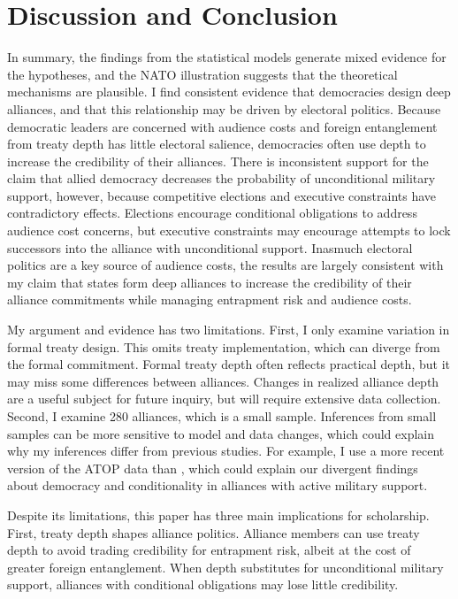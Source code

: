 \documentclass[12pt]{article}
\begin{document}
\section{Discussion and Conclusion} 


In summary, the findings from the statistical models generate mixed evidence for the hypotheses, and the NATO illustration suggests that the theoretical mechanisms are plausible. 
I find consistent evidence that democracies design deep alliances, and that this relationship may be driven by electoral politics.  
Because democratic leaders are concerned with audience costs and foreign entanglement from treaty depth has little electoral salience, democracies often use depth to increase the credibility of their alliances.
There is inconsistent support for the claim that allied democracy decreases the probability of unconditional military support, however, because competitive elections and executive constraints have contradictory effects. 
Elections encourage conditional obligations to address audience cost concerns, but executive constraints may encourage attempts to lock successors into the alliance with unconditional support.
Inasmuch electoral politics are a key source of audience costs, the results are largely consistent with my claim that states form deep alliances to increase the credibility of their alliance commitments while managing entrapment risk and audience costs.


My argument and evidence has two limitations.
First, I only examine variation in formal treaty design. 
This omits treaty implementation, which can diverge from the formal commitment.   
Formal treaty depth often reflects practical depth, but it may miss some differences between alliances. 
Changes in realized alliance depth are a useful subject for future inquiry, but will require extensive data collection.
Second, I examine 280 alliances, which is a small sample. 
Inferences from small samples can be more sensitive to model and data changes, which could explain why my inferences differ from previous studies. 
For example, I use a more recent version of the ATOP data than \citet{Chibaetal2015}, which could explain our divergent findings about democracy and conditionality in alliances with active military support. 


Despite its limitations, this paper has three main implications for scholarship. 
First, treaty depth shapes alliance politics. 
Alliance members can use treaty depth to avoid trading credibility for entrapment risk, albeit at the cost of greater foreign entanglement. 
When depth substitutes for unconditional military support, alliances with conditional obligations may lose little credibility.  
\end{document}

